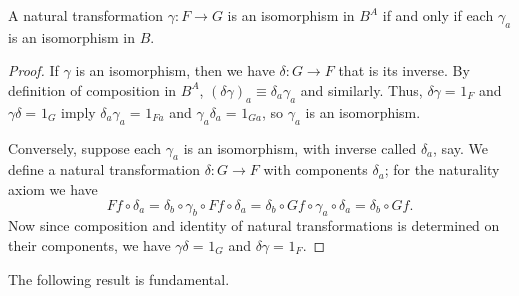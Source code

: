 \documentclass{amsart}
\newcommand{\jdeq}{\equiv}      %
\newcommand{\id}[3][]{\ensuremath{#2 =_{#1} #3}\xspace}
\theoremstyle{definition}
\theoremstyle{remark}
\numberwithin{equation}{section}
\begin{document}
\begin{lem}\label{ct:natiso}
  A natural transformation $\gamma:F\to G$ is an isomorphism in $B^A$ if and only if each $\gamma_a$ is an isomorphism in $B$.
\end{lem}
\begin{proof}
  If $\gamma$ is an isomorphism, then we have $\delta:G\to F$ that is its inverse.
  By definition of composition in $B^A$, $(\delta\gamma)_a\jdeq \delta_a\gamma_a$ and similarly.
  Thus, $\id{\delta\gamma}{1_F}$ and $\id{\gamma\delta}{1_G}$ imply $\id{\delta_a\gamma_a}{1_{Fa}}$ and $\id{\gamma_a\delta_a}{1_{Ga}}$, so $\gamma_a$ is an isomorphism.

  Conversely, suppose each $\gamma_a$ is an isomorphism, with inverse called $\delta_a$, say.
We define a natural transformation $\delta:G\to F$ with components $\delta_a$; for the naturality axiom we have
  \[ Ff\circ \delta_a = \delta_b\circ \gamma_b\circ Ff \circ \delta_a = \delta_b\circ Gf\circ \gamma_a\circ \delta_a = \delta_b\circ Gf. \]
  Now since composition and identity of natural transformations is determined on their components, we have $\id{\gamma\delta}{1_G}$ and $\id{\delta\gamma}{1_F}$.
\end{proof}

The following result is fundamental.
\end{document}

